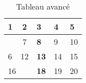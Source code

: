 \documentclass{article}
\begin{document}
\begin{table}[h]
    \centering
    \caption{Tableau avancé}
    \begin{tabular}{lclll}
    \hline
    \multicolumn{1}{|l|}{1} & \multicolumn{1}{c|}{2} & \multicolumn{1}{l|}{\textbf{3}} & \multicolumn{1}{l|}{4} & \multicolumn{1}{l|}{5}     \\ \hline
                            & 7                      & \textbf{8}                      & 9                      & 10                         \\
    \multirow{-2}{*}{6}     & 12                     & \textbf{13}                     & 14                     & \cellcolor[HTML]{FE0000}15 \\
    \multicolumn{2}{l}{16}                           & \textbf{18}                     & 19                     & 20                        
    \end{tabular}
    \end{table}
\end{document}
